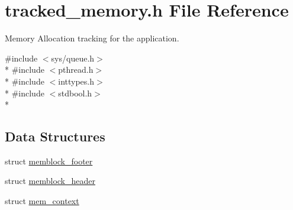 \section{tracked\-\_\-memory.\-h File Reference}
\label{tracked__memory_8h}


Memory Allocation tracking for the application.  


{\ttfamily \#include $<$sys/queue.\-h$>$}\\*
{\ttfamily \#include $<$pthread.\-h$>$}\\*
{\ttfamily \#include $<$inttypes.\-h$>$}\\*
{\ttfamily \#include $<$stdbool.\-h$>$}\\*
\subsection*{Data Structures}
\begin{DoxyCompactItemize}
\item 
struct \hyperlink{structmemblock__footer}{memblock\-\_\-footer}
\item 
struct \hyperlink{structmemblock__header}{memblock\-\_\-header}
\item 
struct \hyperlink{structmem__context}{mem\-\_\-context}
\end{DoxyCompactItemize}
